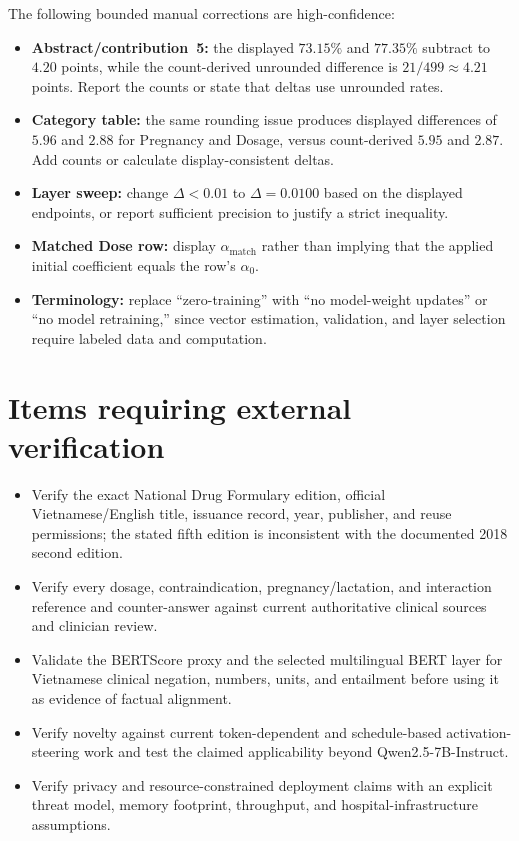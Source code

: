 \documentclass[11pt]{article}
\begin{document}
The following bounded manual corrections are high-confidence:
\begin{itemize}
    \item \textbf{Abstract/contribution~5:} the displayed $73.15\%$ and $77.35\%$ subtract to $4.20$ points, while the count-derived unrounded difference is $21/499\approx4.21$ points.  Report the counts or state that deltas use unrounded rates.
    \item \textbf{Category table:} the same rounding issue produces displayed differences of $5.96$ and $2.88$ for Pregnancy and Dosage, versus count-derived $5.95$ and $2.87$.  Add counts or calculate display-consistent deltas.
    \item \textbf{Layer sweep:} change $\Delta<0.01$ to $\Delta=0.0100$ based on the displayed endpoints, or report sufficient precision to justify a strict inequality.
    \item \textbf{Matched Dose row:} display $\alpha_{\mathrm{match}}$ rather than implying that the applied initial coefficient equals the row's $\alpha_0$.
    \item \textbf{Terminology:} replace ``zero-training'' with ``no model-weight updates'' or ``no model retraining,'' since vector estimation, validation, and layer selection require labeled data and computation.
\end{itemize}

\section*{Items requiring external verification}

\begin{itemize}
    \item Verify the exact National Drug Formulary edition, official Vietnamese/English title, issuance record, year, publisher, and reuse permissions; the stated fifth edition is inconsistent with the documented 2018 second edition.
    \item Verify every dosage, contraindication, pregnancy/lactation, and interaction reference and counter-answer against current authoritative clinical sources and clinician review.
    \item Validate the BERTScore proxy and the selected multilingual BERT layer for Vietnamese clinical negation, numbers, units, and entailment before using it as evidence of factual alignment.
    \item Verify novelty against current token-dependent and schedule-based activation-steering work and test the claimed applicability beyond Qwen2.5-7B-Instruct.
    \item Verify privacy and resource-constrained deployment claims with an explicit threat model, memory footprint, throughput, and hospital-infrastructure assumptions.
\end{itemize}
\end{document}
